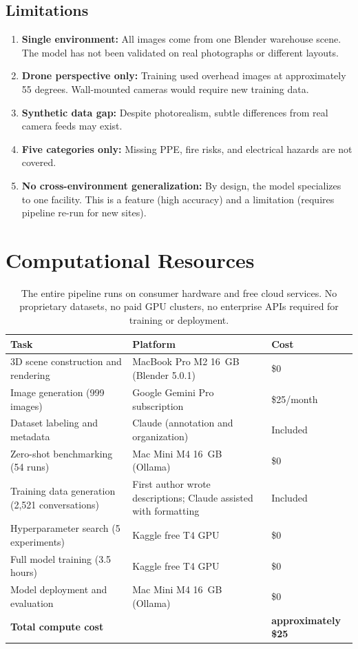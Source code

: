 \documentclass[12pt, a4paper]{article}
\begin{document}
\subsection{Limitations}

\begin{enumerate}
    \item \textbf{Single environment:} All images come from one Blender warehouse scene. The model has not been validated on real photographs or different layouts.
    \item \textbf{Drone perspective only:} Training used overhead images at approximately 55 degrees. Wall-mounted cameras would require new training data.
    \item \textbf{Synthetic data gap:} Despite photorealism, subtle differences from real camera feeds may exist.
    \item \textbf{Five categories only:} Missing PPE, fire risks, and electrical hazards are not covered.
    \item \textbf{No cross-environment generalization:} By design, the model specializes to one facility. This is a feature (high accuracy) and a limitation (requires pipeline re-run for new sites).
\end{enumerate}

\section{Computational Resources}

\begin{table}[H]
\centering
\begin{tabular}{lll}
\toprule
\textbf{Task} & \textbf{Platform} & \textbf{Cost} \\
\midrule
3D scene construction and rendering & MacBook Pro M2 16~GB (Blender 5.0.1) & \$0 \\
Image generation (999 images) & Google Gemini Pro subscription & \$25/month \\
Dataset labeling and metadata & Claude (annotation and organization) & Included \\
Zero-shot benchmarking (54 runs) & Mac Mini M4 16~GB (Ollama) & \$0 \\
Training data generation (2,521 conversations) & First author wrote descriptions; Claude assisted with formatting & Included \\
Hyperparameter search (5 experiments) & Kaggle free T4 GPU & \$0 \\
Full model training (3.5 hours) & Kaggle free T4 GPU & \$0 \\
Model deployment and evaluation & Mac Mini M4 16~GB (Ollama) & \$0 \\
\midrule
\textbf{Total compute cost} & & \textbf{approximately \$25} \\
\bottomrule
\end{tabular}
\caption{The entire pipeline runs on consumer hardware and free cloud services. No proprietary datasets, no paid GPU clusters, no enterprise APIs required for training or deployment.}
\end{table}
\end{document}

